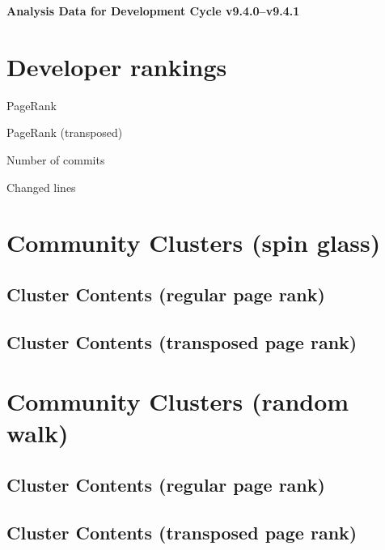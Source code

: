 \documentclass{article}
\begin{document}
\setlength{\parindent}{0pt}
\begin{center}
\begin{Large}
\textbf{Analysis Data for Development Cycle v9.4.0--v9.4.1}
\end{Large}
\end{center}
\section{Developer rankings}
\begin{small}\renewcommand{\tabcolsep}{1pt}
\begin{minipage}{0.5\linewidth}
PageRank\\

\end{minipage}%
\begin{minipage}{0.5\linewidth}
PageRank (transposed)\\

\end{minipage}

\renewcommand{\tabcolsep}{5pt}
\begin{minipage}{0.5\linewidth}
Number of commits\\

\end{minipage}%
\begin{minipage}{0.5\linewidth}
Changed lines\\

\end{minipage}
\end{small}
\newpage\section{Community Clusters (spin glass)}
\subsection{Cluster Contents (regular page rank)}
\newpage\subsection{Cluster Contents (transposed page rank)}
\newpage\section{Community Clusters (random walk)}
\subsection{Cluster Contents (regular page rank)}
\newpage\subsection{Cluster Contents (transposed page rank)}
\end{document}
